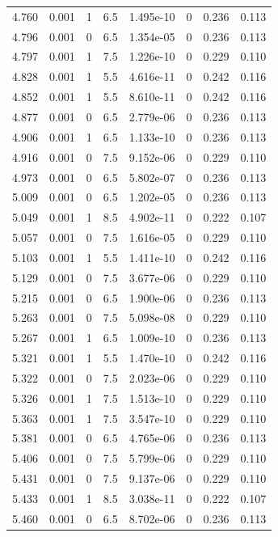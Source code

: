 \documentclass[preview]{standalone}
\begin{document}
{{{{\begin{tabular}{L{1.2cm}C{1.2cm} C{0.3cm}C{0.5cm} C{1.4cm}C{1.4cm} C{1.4cm}C{1.4cm}}
  4.760  &  0.001  & 1     & 6.5 &  1.495e-10  & 0  & 0.236 &  0.113   \\ 
  4.796  &  0.001  & 0     & 6.5 &  1.354e-05  & 0  & 0.236 &  0.113   \\ 
  4.797  &  0.001  & 1     & 7.5 &  1.226e-10  & 0  & 0.229 &  0.110   \\ 
  4.828  &  0.001  & 1     & 5.5 &  4.616e-11  & 0  & 0.242 &  0.116   \\ 
  4.852  &  0.001  & 1     & 5.5 &  8.610e-11  & 0  & 0.242 &  0.116   \\ 
  4.877  &  0.001  & 0     & 6.5 &  2.779e-06  & 0  & 0.236 &  0.113   \\ 
  4.906  &  0.001  & 1     & 6.5 &  1.133e-10  & 0  & 0.236 &  0.113   \\ 
  4.916  &  0.001  & 0     & 7.5 &  9.152e-06  & 0  & 0.229 &  0.110   \\ 
  4.973  &  0.001  & 0     & 6.5 &  5.802e-07  & 0  & 0.236 &  0.113   \\ 
  5.009  &  0.001  & 0     & 6.5 &  1.202e-05  & 0  & 0.236 &  0.113   \\ 
  5.049  &  0.001  & 1     & 8.5 &  4.902e-11  & 0  & 0.222 &  0.107   \\ 
  5.057  &  0.001  & 0     & 7.5 &  1.616e-05  & 0  & 0.229 &  0.110   \\ 
  5.103  &  0.001  & 1     & 5.5 &  1.411e-10  & 0  & 0.242 &  0.116   \\ 
  5.129  &  0.001  & 0     & 7.5 &  3.677e-06  & 0  & 0.229 &  0.110   \\ 
  5.215  &  0.001  & 0     & 6.5 &  1.900e-06  & 0  & 0.236 &  0.113   \\ 
  5.263  &  0.001  & 0     & 7.5 &  5.098e-08  & 0  & 0.229 &  0.110   \\ 
  5.267  &  0.001  & 1     & 6.5 &  1.009e-10  & 0  & 0.236 &  0.113   \\ 
  5.321  &  0.001  & 1     & 5.5 &  1.470e-10  & 0  & 0.242 &  0.116   \\ 
  5.322  &  0.001  & 0     & 7.5 &  2.023e-06  & 0  & 0.229 &  0.110   \\ 
  5.326  &  0.001  & 1     & 7.5 &  1.513e-10  & 0  & 0.229 &  0.110   \\ 
  5.363  &  0.001  & 1     & 7.5 &  3.547e-10  & 0  & 0.229 &  0.110   \\ 
  5.381  &  0.001  & 0     & 6.5 &  4.765e-06  & 0  & 0.236 &  0.113   \\ 
  5.406  &  0.001  & 0     & 7.5 &  5.799e-06  & 0  & 0.229 &  0.110   \\ 
  5.431  &  0.001  & 0     & 7.5 &  9.137e-06  & 0  & 0.229 &  0.110   \\ 
  5.433  &  0.001  & 1     & 8.5 &  3.038e-11  & 0  & 0.222 &  0.107   \\ 
  5.460  &  0.001  & 0     & 6.5 &  8.702e-06  & 0  & 0.236 &  0.113   \\ 
\hline 
\end{tabular} 

}}}}
\end{document}
